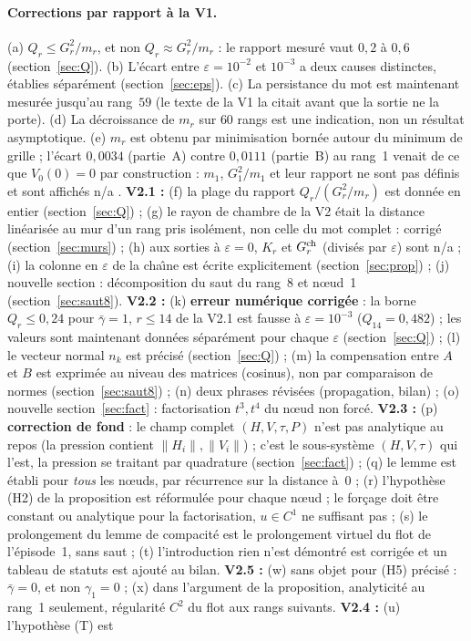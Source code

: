 \documentclass[11pt,a4paper]{article}
\theoremstyle{remark}
\begin{document}
\paragraph{Corrections par rapport \`a la V1.}
(a) $Q_r\le G_r^2/m_r$, et non $Q_r\approx G_r^2/m_r$ : le rapport mesur\'e vaut $0{,}2$ \`a $0{,}6$ (section~\ref{sec:Q}). (b) L'\'ecart entre $\varepsilon=10^{-2}$ et $10^{-3}$ a deux causes distinctes, \'etablies s\'epar\'ement (section~\ref{sec:eps}). (c) La persistance du mot est maintenant mesur\'ee jusqu'au rang~$59$ (le texte de la V1 la citait avant que la sortie ne la porte). (d) La d\'ecroissance de $m_r$ sur $60$ rangs est une indication, non un r\'esultat asymptotique. (e) $m_r$ est obtenu par minimisation born\'ee autour du minimum de grille ; l'\'ecart $0{,}0034$ (partie~A) contre $0{,}0111$ (partie~B) au rang~1 venait de ce que $V_0(0)=0$ par construction : $m_1$, $G_1^2/m_1$ et leur rapport ne sont pas d\'efinis et sont affich\'es \og n/a \fg. \textbf{V2.1 :} (f) la plage du rapport $Q_r/(G_r^2/m_r)$ est donn\'ee en entier (section~\ref{sec:Q}) ; (g) le \og rayon de chambre \fg{} de la V2 \'etait la distance lin\'earis\'ee au mur d'un rang pris isol\'ement, non celle du mot complet : corrig\'e (section~\ref{sec:murs}) ; (h) aux sorties \`a $\varepsilon=0$, $K_r$ et $G_r^{\rm ch}$ (divis\'es par $\varepsilon$) sont \og n/a \fg{} ; (i) la colonne en $\varepsilon$ de la cha\^{\i}ne est \'ecrite explicitement (section~\ref{sec:prop}) ; (j) nouvelle section : d\'ecomposition du saut du rang~8 et n\oe ud~1 (section~\ref{sec:saut8}). \textbf{V2.2 :} (k) \textbf{erreur num\'erique corrig\'ee} : la borne \og $Q_r\le0{,}24$ pour $\bar\gamma=1$, $r\le14$ \fg{} de la V2.1 est fausse \`a $\varepsilon=10^{-3}$ ($Q_{14}=0{,}482$) ; les valeurs sont maintenant donn\'ees s\'epar\'ement pour chaque $\varepsilon$ (section~\ref{sec:Q}) ; (l) le vecteur normal $n_k$ est pr\'ecis\'e (section~\ref{sec:Q}) ; (m) la compensation entre $A$ et $B$ est exprim\'ee au niveau des matrices (cosinus), non par comparaison de normes (section~\ref{sec:saut8}) ; (n) deux phrases r\'evis\'ees (propagation, bilan) ; (o) nouvelle section~\ref{sec:fact} : factorisation $t^3,t^4$ du n\oe ud non forc\'e. \textbf{V2.3 :} (p) \textbf{correction de fond} : le champ complet $(H,V,\tau,P)$ n'est pas analytique au repos (la pression contient $\lVert H_i\rVert,\lVert V_i\rVert$) ; c'est le sous-syst\`eme $(H,V,\tau)$ qui l'est, la pression se traitant par quadrature (section~\ref{sec:fact}) ; (q) le lemme est \'etabli pour \emph{tous} les n\oe uds, par r\'ecurrence sur la distance \`a~0 ; (r) l'hypoth\`ese (H2) de la proposition est r\'eformul\'ee pour chaque n\oe ud ; le for\c{c}age doit \^etre constant ou analytique pour la factorisation, $u\in C^1$ ne suffisant pas ; (s) le prolongement du lemme de compacit\'e est le prolongement virtuel du flot de l'\'episode~1, sans saut ; (t) l'introduction \og rien n'est d\'emontr\'e \fg{} est corrig\'ee et un tableau de statuts est ajout\'e au bilan. \textbf{V2.5 :} (w) \og sans objet \fg{} pour (H5) pr\'ecis\'e : $\bar\gamma=0$, et non $\gamma_1=0$ ; (x) dans l'argument de la proposition, analyticit\'e au rang~1 seulement, r\'egularit\'e $C^2$ du flot aux rangs suivants. \textbf{V2.4 :} (u) l'hypoth\`ese (T) est 
\end{document}
